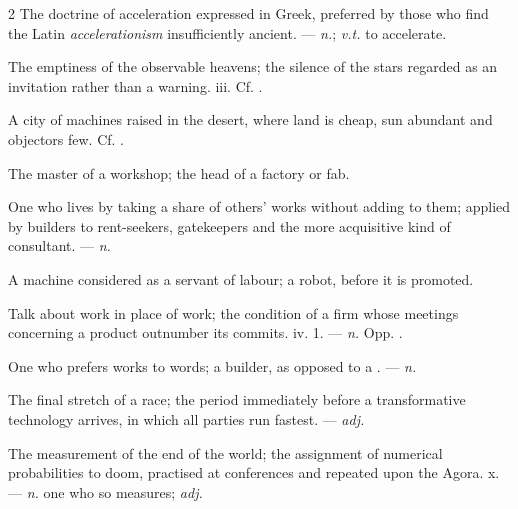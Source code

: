 \begin{multicols}{2}
 The doctrine of acceleration expressed in Greek, preferred by those who find the Latin \textit{accelerationism} insufficiently ancient. —  \textit{n.};  \textit{v.t.} to accelerate.

 The emptiness of the observable heavens; the silence of the stars regarded as an invitation rather than a warning.   iii. Cf. .

 A city of machines raised in the desert, where land is cheap, sun abundant and objectors few.   Cf. .

 The master of a workshop; the head of a factory or fab.

  One who lives by taking a share of others' works without adding to them; applied by builders to rent-seekers, gatekeepers and the more acquisitive kind of consultant. —  \textit{n.}

 A machine considered as a servant of labour; a robot, before it is promoted.

 Talk about work in place of work; the condition of a firm whose meetings concerning a product outnumber its commits.   iv. 1. —  \textit{n.} Opp. .

 One who prefers works to words; a builder, as opposed to a . —  \textit{n.}

 The final stretch of a race; the period immediately before a transformative technology arrives, in which all parties run fastest. —  \textit{adj.}

 The measurement of the end of the world; the assignment of numerical probabilities to doom, practised at conferences and repeated upon the Agora.   x. —  \textit{n.} one who so measures;  \textit{adj.}


\end{multicols}
